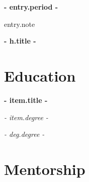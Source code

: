 \documentclass[11pt,a4paper]{article}
\newcommand{\artifacts}[1]{\hspace{0.45em}{\footnotesize #1}}
\newlength{\projindent}\setlength{\projindent}{1.3em}
\newlength{\projbulletindent}\setlength{\projbulletindent}{2.7em}
\begin{document}
{%
\textsc{\textbf{ }} \hfill\textbf{ {{- entry.period -}} }\par
{%
{\small {{ entry.note }} }\par
{%
{%
\vspace{2pt}
{\leftskip\projindent\textbf{ {{- h.title -}} }{%
{%
{%
{%
\smallskip

{%
\newpage

\section{Education}
{%
\textbf{ {{- item.title -}} }{%
{%
\textit{ {{- item.degree -}} }\par
{%
{%
{\leftskip{}\par}
{%
{%
\textit{ {{- deg.degree -}} }{%
{%
{\leftskip{}\par}
{%
{%
\smallskip

{%

{%
\section{Mentorship}
{%

}}}}}}}}}}}}}}}}}}}}}}}}
\end{document}
